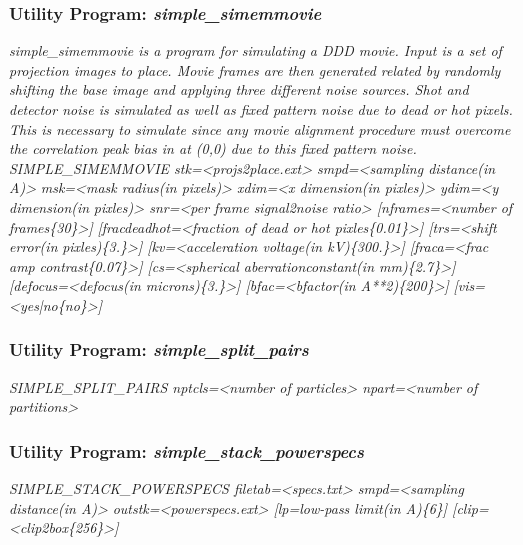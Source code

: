 \documentclass[review]{elsarticle}
\begin{document}
{{\subsubsection{Utility Program: {\it{simple\_simemmovie}}}
\label{simemmovie}
{\it{simple\_simemmovie} is a program for simulating a DDD movie. Input is a set of projection images to place. Movie frames are then generated related by randomly shifting the base image and applying three different noise sources. Shot and detector noise is simulated as well as fixed pattern noise due to dead or hot pixels. This is necessary to simulate since any movie alignment procedure must overcome the correlation peak bias in at (0,0) due to this fixed pattern noise.}\\
{\it{SIMPLE\_SIMEMMOVIE stk=<projs2place.ext> smpd=<sampling distance(in A)>}}
{\it{msk=<mask radius(in pixels)> xdim=<x dimension(in pixles)> ydim=<y dimension(in}}
{\it{pixles)> snr=<per frame signal2noise ratio> [nframes=<number of frames\{30\}>]}}
{\it{[fracdeadhot=<fraction of dead or hot pixles\{0.01\}>] [trs=<shift error(in}}
{\it{pixles)\{3.\}>] [kv=<acceleration voltage(in kV)\{300.\}>] [fraca=<frac amp}}
{\it{contrast\{0.07\}>] [cs=<spherical aberrationconstant(in mm)\{2.7\}>]}}
{\it{[defocus=<defocus(in microns)\{3.\}>] [bfac=<bfactor(in A**2)\{200\}>]}}
{\it{[vis=<yes|no\{no\}>]}}

\subsubsection{Utility Program: {\it{simple\_split\_pairs}}}
\label{split_pairs}
{\it{SIMPLE\_SPLIT\_PAIRS nptcls=<number of particles> npart=<number of partitions>}}

\subsubsection{Utility Program: {\it{simple\_stack\_powerspecs}}}
\label{stack_powerspecs}
{\it{SIMPLE\_STACK\_POWERSPECS filetab=<specs.txt> smpd=<sampling distance(in A)>}}
{\it{outstk=<powerspecs.ext> [lp=low-pass limit(in A)\{6\}] [clip=<clip2box\{256\}>]}}

}}
\end{document}
